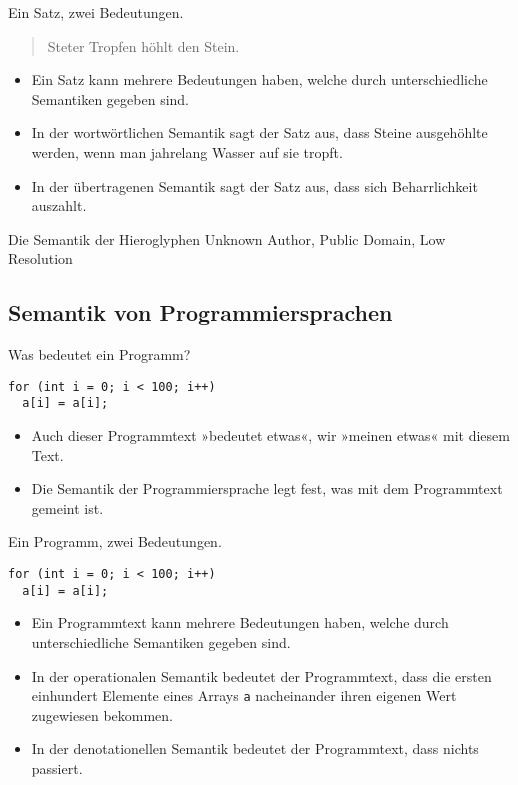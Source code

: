 \begin{frame}{Ein Satz, zwei Bedeutungen.}
  \begin{quotation}
    Steter Tropfen höhlt den Stein.
  \end{quotation}

  \bigskip
  \begin{itemize}
  \item Ein Satz kann \alert{mehrere Bedeutungen haben}, welche durch
    \alert{unterschiedliche Semantiken} gegeben sind.
  \item In der \alert{wortwörtlichen Semantik} sagt der Satz aus, dass
    Steine ausgehöhlte werden, wenn man jahrelang Wasser auf
    sie tropft.
  \item In der \alert{übertragenen Semantik} sagt der Satz aus, dass
    sich Beharrlichkeit auszahlt.
  \end{itemize}
\end{frame}

\begin{frame}{Die Semantik der Hieroglyphen}
  {Unknown Author, Public Domain, Low Resolution}
\end{frame}


\subsection{Semantik von Programmiersprachen}

\begin{frame}[fragile]{Was bedeutet ein Programm?}
\begin{verbatim}
for (int i = 0; i < 100; i++)
  a[i] = a[i];
\end{verbatim}
  \begin{itemize}
  \item Auch dieser Programmtext »bedeutet etwas«, wir »meinen etwas«
    mit diesem Text.
  \item Die \alert{Semantik der Programmiersprache} legt fest,
    was mit dem Programmtext gemeint ist.
  \end{itemize}
\end{frame}

\begin{frame}[fragile]{Ein Programm, zwei Bedeutungen.}
\begin{verbatim}
for (int i = 0; i < 100; i++)
  a[i] = a[i];
\end{verbatim}
  \begin{itemize}
  \item Ein Programmtext kann \alert{mehrere Bedeutungen haben},
    welche durch \alert{unterschiedliche Semantiken} gegeben sind.
  \item In der \alert{operationalen Semantik} bedeutet der
    Programmtext, dass die ersten einhundert Elemente eines Arrays
    \verb!a! nacheinander ihren eigenen Wert zugewiesen bekommen.
  \item In der \alert{denotationellen Semantik} bedeutet der
    Programmtext, dass nichts passiert.
  \end{itemize}
\end{frame}


